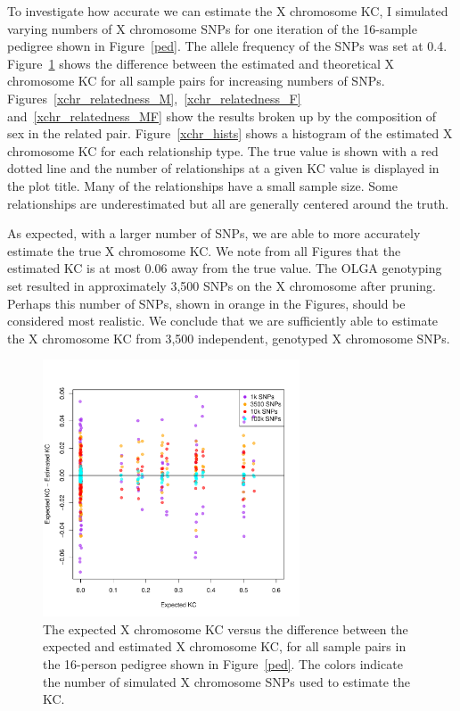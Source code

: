 \documentclass[11pt]{article} %
\begin{document}
To investigate how accurate we can estimate the X chromosome KC, I simulated varying numbers of X chromosome SNPs for one iteration of the 16-sample pedigree shown in Figure~\ref{ped}. The allele frequency of the SNPs was set at 0.4. Figure~\ref{xchr_relatedness} shows the difference between the estimated and theoretical X chromosome KC for all sample pairs for increasing numbers of SNPs.  Figures~\ref{xchr_relatedness_M},~\ref{xchr_relatedness_F} and~\ref{xchr_relatedness_MF} show the results broken up by the composition of sex in the related pair. 
Figure~\ref{xchr_hists} shows a histogram of the estimated X chromosome KC for each relationship type. The true value is shown with a red dotted line and the number of relationships at a given KC value is displayed in the plot title. Many of the relationships have a small sample size.  Some relationships are underestimated but all are generally centered around the truth.

As expected, with a larger number of SNPs, we are able to more accurately estimate the true X chromosome KC. We note from all Figures that the estimated KC is at most 0.06 away from the true value. The OLGA genotyping set resulted in approximately 3,500 SNPs on the X chromosome after pruning. Perhaps this number of SNPs, shown in orange in the Figures, should be considered most realistic. We conclude that we are sufficiently able to estimate the X chromosome KC from 3,500 independent, genotyped X chromosome SNPs.

\begin{figure}
\begin{center}
\includegraphics[height=3in]{xchrKcEstimatedVsTrue.pdf}
\caption{The expected X chromosome KC versus the difference between the expected and estimated X chromosome KC, for all sample pairs in the 16-person pedigree shown in Figure~\ref{ped}. The colors indicate the number of simulated X chromosome SNPs used to estimate the KC.}
\label{xchr_relatedness}
\end{center}
\end{figure}
\end{document}
